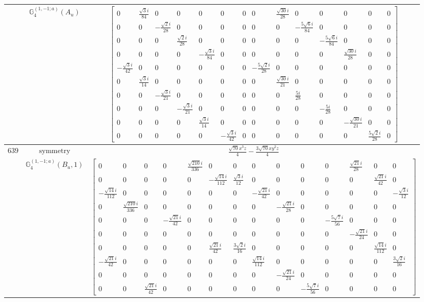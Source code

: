\documentclass[fleqn,8pt,landscape]{jsarticle}
\begin{document}
\begin{longtable}{ccc}
$  $ & $ \mathbb{G}_{4}^{(1,-1;a)}(A_{u}) $ & $ \begin{bmatrix} 0 & \frac{\sqrt{3} i}{84} & 0 & 0 & 0 & 0 & 0 & 0 & \frac{\sqrt{30} i}{28} & 0 & 0 & 0 & 0 & 0 \\ 0 & 0 & - \frac{\sqrt{2} i}{28} & 0 & 0 & 0 & 0 & 0 & 0 & - \frac{5 \sqrt{6} i}{84} & 0 & 0 & 0 & 0 \\ 0 & 0 & 0 & \frac{\sqrt{2} i}{28} & 0 & 0 & 0 & 0 & 0 & 0 & - \frac{5 \sqrt{6} i}{84} & 0 & 0 & 0 \\ 0 & 0 & 0 & 0 & - \frac{\sqrt{3} i}{84} & 0 & 0 & 0 & 0 & 0 & 0 & \frac{\sqrt{30} i}{28} & 0 & 0 \\ - \frac{\sqrt{3} i}{42} & 0 & 0 & 0 & 0 & 0 & 0 & - \frac{5 \sqrt{2} i}{28} & 0 & 0 & 0 & 0 & 0 & 0 \\ 0 & \frac{\sqrt{3} i}{14} & 0 & 0 & 0 & 0 & 0 & 0 & \frac{\sqrt{30} i}{21} & 0 & 0 & 0 & 0 & 0 \\ 0 & 0 & - \frac{\sqrt{3} i}{21} & 0 & 0 & 0 & 0 & 0 & 0 & \frac{5 i}{28} & 0 & 0 & 0 & 0 \\ 0 & 0 & 0 & - \frac{\sqrt{3} i}{21} & 0 & 0 & 0 & 0 & 0 & 0 & - \frac{5 i}{28} & 0 & 0 & 0 \\ 0 & 0 & 0 & 0 & \frac{\sqrt{3} i}{14} & 0 & 0 & 0 & 0 & 0 & 0 & - \frac{\sqrt{30} i}{21} & 0 & 0 \\ 0 & 0 & 0 & 0 & 0 & - \frac{\sqrt{3} i}{42} & 0 & 0 & 0 & 0 & 0 & 0 & \frac{5 \sqrt{2} i}{28} & 0 \end{bmatrix} $ \\ \hline
$ 639 $ & $ \text{symmetry} $ & $ \frac{\sqrt{70} x^{3} z}{4} - \frac{3 \sqrt{70} x y^{2} z}{4} $ \\
$  $ & $ \mathbb{G}_{4}^{(1,-1;a)}(B_{u},1) $ & $ \begin{bmatrix} 0 & 0 & 0 & 0 & \frac{\sqrt{210} i}{336} & 0 & 0 & 0 & 0 & 0 & 0 & \frac{\sqrt{21} i}{28} & 0 & 0 \\ 0 & 0 & 0 & 0 & 0 & - \frac{\sqrt{14} i}{112} & \frac{\sqrt{3} i}{12} & 0 & 0 & 0 & 0 & 0 & \frac{\sqrt{21} i}{42} & 0 \\ - \frac{\sqrt{14} i}{112} & 0 & 0 & 0 & 0 & 0 & 0 & - \frac{\sqrt{21} i}{42} & 0 & 0 & 0 & 0 & 0 & - \frac{\sqrt{3} i}{12} \\ 0 & \frac{\sqrt{210} i}{336} & 0 & 0 & 0 & 0 & 0 & 0 & - \frac{\sqrt{21} i}{28} & 0 & 0 & 0 & 0 & 0 \\ 0 & 0 & 0 & - \frac{\sqrt{21} i}{42} & 0 & 0 & 0 & 0 & 0 & 0 & - \frac{5 \sqrt{7} i}{56} & 0 & 0 & 0 \\ 0 & 0 & 0 & 0 & 0 & 0 & 0 & 0 & 0 & 0 & 0 & - \frac{\sqrt{21} i}{24} & 0 & 0 \\ 0 & 0 & 0 & 0 & 0 & \frac{\sqrt{21} i}{42} & \frac{3 \sqrt{2} i}{16} & 0 & 0 & 0 & 0 & 0 & \frac{\sqrt{14} i}{112} & 0 \\ - \frac{\sqrt{21} i}{42} & 0 & 0 & 0 & 0 & 0 & 0 & \frac{\sqrt{14} i}{112} & 0 & 0 & 0 & 0 & 0 & \frac{3 \sqrt{2} i}{16} \\ 0 & 0 & 0 & 0 & 0 & 0 & 0 & 0 & - \frac{\sqrt{21} i}{24} & 0 & 0 & 0 & 0 & 0 \\ 0 & 0 & \frac{\sqrt{21} i}{42} & 0 & 0 & 0 & 0 & 0 & 0 & - \frac{5 \sqrt{7} i}{56} & 0 & 0 & 0 & 0 \end{bmatrix} $ \\ \hline

\end{longtable}
\end{document}
